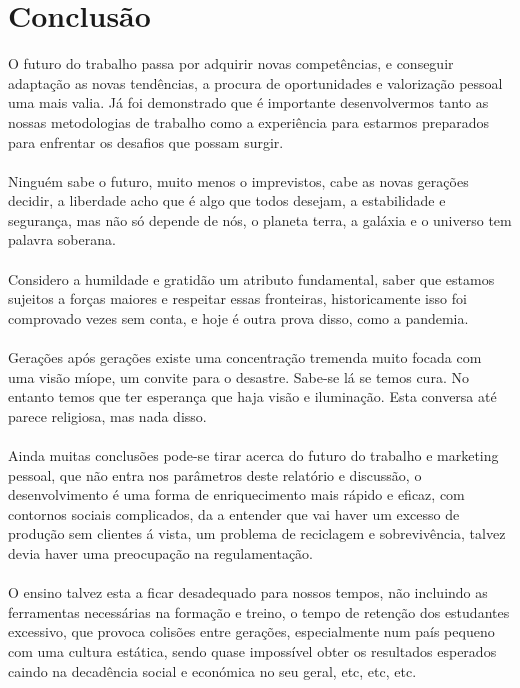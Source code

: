 \section{Conclusão}
\qquad O futuro do trabalho passa por adquirir novas competências, e conseguir adaptação as novas tendências, a procura de oportunidades e valorização pessoal uma mais valia. Já foi demonstrado que é importante desenvolvermos tanto as nossas metodologias de trabalho como a experiência para estarmos preparados para enfrentar os desafios que possam surgir. \\
\\
Ninguém sabe o futuro, muito menos o imprevistos, cabe as novas gerações decidir, a liberdade acho que é algo que todos desejam, a estabilidade e segurança, mas não só depende de nós, o planeta terra, a galáxia e o universo tem palavra soberana.\\
\\
Considero a humildade e gratidão um atributo fundamental, saber que estamos sujeitos a forças maiores e respeitar essas fronteiras, historicamente isso foi comprovado vezes sem conta, e hoje é outra prova disso, como a pandemia.\\
\\
Gerações após gerações existe uma concentração tremenda muito focada com uma visão míope, um convite para o desastre. Sabe-se lá se temos cura. No entanto temos que ter esperança que haja visão e iluminação.
Esta conversa até parece religiosa, mas nada disso.\\
\\
Ainda muitas conclusões pode-se tirar acerca do futuro do trabalho e marketing pessoal, que não entra nos parâmetros deste relatório e discussão, o desenvolvimento é uma forma de enriquecimento mais rápido e eficaz, com contornos sociais complicados, da a entender que vai haver um excesso de produção sem clientes á vista, um problema de reciclagem e sobrevivência, talvez devia haver uma preocupação na  regulamentação.\\
\\
O ensino talvez esta a ficar desadequado para nossos tempos, não incluindo as ferramentas necessárias na formação e treino, o tempo de retenção dos estudantes excessivo, que provoca colisões entre gerações, especialmente num país pequeno com uma cultura estática, sendo quase impossível obter os resultados esperados caindo na decadência social e económica no seu geral, etc, etc, etc.\\
